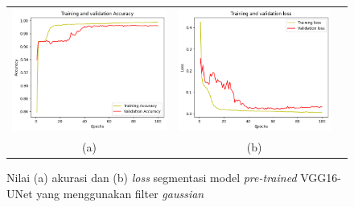 \begin{enumerate}
	
	\begin{figure}[htbp]
		\centering
		\begin{tabular}{ccc}
			\includegraphics[scale=0.5]{bab4/acc-gaussian-vggunet.png} &
			\includegraphics[scale=0.5]{bab4/loss-gaussian-vggunet.png} & \\
			(a) & (b)    %
		\end{tabular}
		\caption{Nilai (a) akurasi dan (b) \textit{loss} segmentasi model \textit{pre-trained} VGG16-UNet yang menggunakan filter \textit{gaussian}}
		\label{fig:performance-gaussian-vggunet}
	\end{figure}
	

\end{enumerate}
